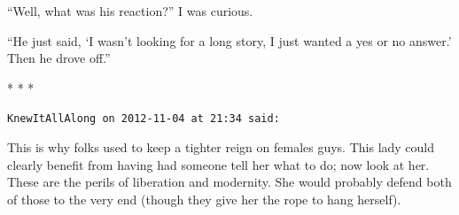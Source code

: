 ``Well, what was his reaction?'' I was curious.

``He just said, `I wasn't looking for a long story, I just wanted a yes or no answer.' Then he drove off.''



\begin{center}* * *\end{center}

\begin{footnotesize}
\begin{sffamily}
\texttt{KnewItAllAlong on 2012-11-04 at 21:34 said:}

This is why folks used to keep a tighter reign on females guys. This lady could clearly benefit from having had someone tell her what to do; now look at her. These are the perils of liberation and modernity. She would probably defend both of those to the very end (though they give her the rope to hang herself).


\hfill

\end{sffamily}
\end{footnotesize}

